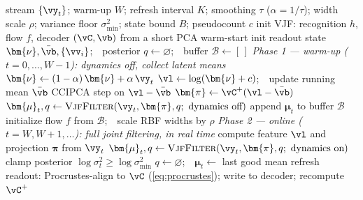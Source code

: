 \documentclass[11pt]{article}
\newcommand{\vmu}{\bm{\mu}}
\newcommand{\vnu}{\bm{\nu}}
\newcommand{\vpi}{\bm{\pi}}
\newcommand{\svjf}{sVJF}
\begin{document}
\begin{algorithm}[!t]
\caption{\svjf: real-time VJF with projection encoder and decoupled online readout (one pass).}
\label{alg:rtvjf}
\begin{algorithmic}[1]
\Require stream $\{\vy_t\}$; warm-up $W$; refresh interval $K$; smoothing $\tau$ ($\alpha{=}1/\tau$);
  width scale $\rho$; variance floor $\sigma^2_{\min}$; state bound $B$; pseudocount $c$
\State init VJF: recognition $h$, flow $f$, decoder $(\vC,\vb)$ from a short PCA warm-start
\State init readout state $\vnu,\bar\vb,\{\vv_i\}$;\ \ posterior $q\gets\varnothing$;\ \ buffer $\mathcal B\gets[\,]$
\Statex \textit{Phase 1 --- warm-up ($t=0,\dots,W{-}1$): dynamics off, collect latent means}
  \State $\vnu \gets (1-\alpha)\,\vnu + \alpha\,\vy_t$ 
  \State $\vl \gets \log(\vnu+c)$;\ \ update running mean $\bar\vb$ 
  \State CCIPCA step on $\vl-\bar\vb$ 
  \State $\vpi \gets \vC^{+}(\vl-\bar\vb)$ 
  \State $\vmu_t, q \gets \textsc{VjfFilter}(\vy_t,\vpi,q;\ \text{dynamics off})$ 
  \State append $\vmu_t$ to buffer $\mathcal B$
\EndFor
\State initialize flow $f$ from $\mathcal B$;\ \ scale RBF widths by $\rho$ 
\Statex \textit{Phase 2 --- online ($t=W,W{+}1,\dots$): full joint filtering, in real time}
  \State compute feature $\vl$ and projection $\vpi$ from $\vy_t$ 
  \State $\vmu_t, q \gets \textsc{VjfFilter}(\vy_t,\vpi,q;\ \text{dynamics on})$ 
  \State clamp posterior $\log\sigma^2_t \ge \log\sigma^2_{\min}$ 
  \If{$\vmu_t$ non-finite \textbf{or} $\norm{\vmu_t}_\infty > B$}
    \State $q\gets\varnothing$;\ \ $\vmu_t\gets$ last good mean 
  \EndIf
    \State refresh readout: Procrustes-align to $\vC$ (\cref{eq:procrustes}); write to decoder; recompute $\vC^{+}$
  \EndIf
\EndFor
\end{algorithmic}
\end{algorithm}
\end{document}
